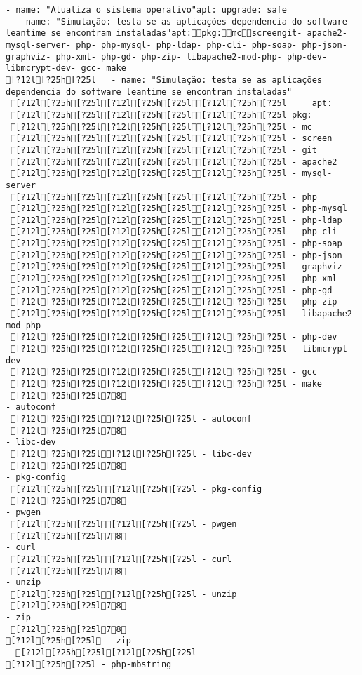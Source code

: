 \documentclass{scrartcl}
\begin{document}
\begin{Verbatim}
- name: "Atualiza o sistema operativo"apt: upgrade: safe
  - name: "Simulação: testa se as aplicações dependencia do software leantime se encontram instaladas"apt:pkg:mcscreengit- apache2- mysql-server- php- php-mysql- php-ldap- php-cli- php-soap- php-json- graphviz- php-xml- php-gd- php-zip- libapache2-mod-php- php-dev- libmcrypt-dev- gcc- make
[?12l[?25h[?25l   - name: "Simulação: testa se as aplicações dependencia do software leantime se encontram instaladas"
 [?12l[?25h[?25l[?12l[?25h[?25l[?12l[?25h[?25l     apt:
 [?12l[?25h[?25l[?12l[?25h[?25l[?12l[?25h[?25l pkg:
 [?12l[?25h[?25l[?12l[?25h[?25l[?12l[?25h[?25l - mc
 [?12l[?25h[?25l[?12l[?25h[?25l[?12l[?25h[?25l - screen
 [?12l[?25h[?25l[?12l[?25h[?25l[?12l[?25h[?25l - git
 [?12l[?25h[?25l[?12l[?25h[?25l[?12l[?25h[?25l - apache2
 [?12l[?25h[?25l[?12l[?25h[?25l[?12l[?25h[?25l - mysql-server
 [?12l[?25h[?25l[?12l[?25h[?25l[?12l[?25h[?25l - php
 [?12l[?25h[?25l[?12l[?25h[?25l[?12l[?25h[?25l - php-mysql
 [?12l[?25h[?25l[?12l[?25h[?25l[?12l[?25h[?25l - php-ldap
 [?12l[?25h[?25l[?12l[?25h[?25l[?12l[?25h[?25l - php-cli
 [?12l[?25h[?25l[?12l[?25h[?25l[?12l[?25h[?25l - php-soap
 [?12l[?25h[?25l[?12l[?25h[?25l[?12l[?25h[?25l - php-json
 [?12l[?25h[?25l[?12l[?25h[?25l[?12l[?25h[?25l - graphviz
 [?12l[?25h[?25l[?12l[?25h[?25l[?12l[?25h[?25l - php-xml
 [?12l[?25h[?25l[?12l[?25h[?25l[?12l[?25h[?25l - php-gd
 [?12l[?25h[?25l[?12l[?25h[?25l[?12l[?25h[?25l - php-zip
 [?12l[?25h[?25l[?12l[?25h[?25l[?12l[?25h[?25l - libapache2-mod-php
 [?12l[?25h[?25l[?12l[?25h[?25l[?12l[?25h[?25l - php-dev
 [?12l[?25h[?25l[?12l[?25h[?25l[?12l[?25h[?25l - libmcrypt-dev
 [?12l[?25h[?25l[?12l[?25h[?25l[?12l[?25h[?25l - gcc
 [?12l[?25h[?25l[?12l[?25h[?25l[?12l[?25h[?25l - make
 [?12l[?25h[?25l78
- autoconf
 [?12l[?25h[?25l[?12l[?25h[?25l - autoconf
 [?12l[?25h[?25l78
- libc-dev
 [?12l[?25h[?25l[?12l[?25h[?25l - libc-dev
 [?12l[?25h[?25l78
- pkg-config
 [?12l[?25h[?25l[?12l[?25h[?25l - pkg-config
 [?12l[?25h[?25l78
- pwgen
 [?12l[?25h[?25l[?12l[?25h[?25l - pwgen
 [?12l[?25h[?25l78
- curl
 [?12l[?25h[?25l[?12l[?25h[?25l - curl
 [?12l[?25h[?25l78
- unzip
 [?12l[?25h[?25l[?12l[?25h[?25l - unzip
 [?12l[?25h[?25l78
- zip
 [?12l[?25h[?25l78
[?12l[?25h[?25l - zip
  [?12l[?25h[?25l[?12l[?25h[?25l
[?12l[?25h[?25l - php-mbstring

\end{Verbatim}
\end{document}
